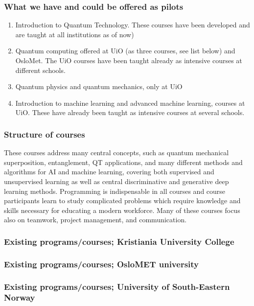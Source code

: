 \documentclass{beamer}
\begin{document}
\begin{frame}
\frametitle{What we have and could be offered as pilots}

\begin{block}{}
\begin{enumerate}
\item Introduction to Quantum Technology. These courses have been developed and are taught at  all institutions as of now)
\item Quantum computing offered at UiO (as three courses, see list below) and  OsloMet. The UiO courses have been taught already as intensive courses at different schools. 
\item Quantum physics and quantum mechanics, only at UiO
\item Introduction to machine  learning and advanced machine learning, courses at UiO. These have already been taught as intensive courses at several schools.
\end{enumerate}

\end{block}
\end{frame}


\begin{frame}
\frametitle{Structure of courses}

These courses address many central concepts, such as quantum
mechanical superposition, entanglement, QT applications, and many
different methods and algorithms for AI and machine learning, covering
both supervised and unsupervised learning as well as central
discriminative and generative deep learning methods. Programming is
indispensable in all courses and course participants learn to
study complicated problems which require knowledge and skills
necessary for educating a modern workforce. Many of these courses
focus also on teamwork, project management, and communication.
\end{frame}



\begin{frame}
\frametitle{Existing programs/courses; Kristiania University College}

\end{frame}

\begin{frame}
\frametitle{Existing programs/courses; OsloMET university}

\end{frame}


\begin{frame}
\frametitle{Existing programs/courses; University of South-Eastern Norway}

\end{frame}
\end{document}
